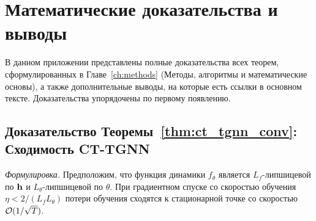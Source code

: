 
\chapter{Математические доказательства и выводы}
\label{app:proofs}

В данном приложении представлены полные доказательства всех теорем, сформулированных в Главе~\ref{ch:methods} (Методы, алгоритмы и математические основы), а также дополнительные выводы, на которые есть ссылки в основном тексте. Доказательства упорядочены по первому появлению.


\section{Доказательство Теоремы~\ref{thm:ct_tgnn_conv}: Сходимость CT-TGNN}
\label{app:proof_ct_conv}

\noindent\textit{Формулировка.} Предположим, что функция динамики $f_\theta$ является $L_f$-липшицевой по $\mathbf{h}$ и $L_\theta$-липшицевой по $\theta$. При градиентном спуске со скоростью обучения $\eta<2/(L_f L_\theta)$ потери обучения сходятся к стационарной точке со скоростью $\mathcal{O}(1/\sqrt{T})$.

